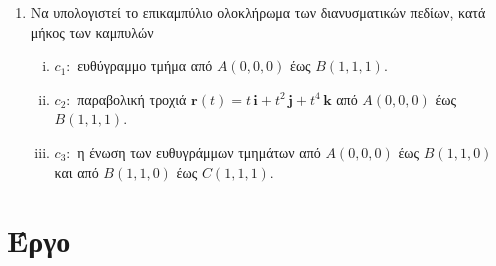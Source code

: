 \begin{enumerate}
  \item Να υπολογιστεί το επικαμπύλιο ολοκλήρωμα των διανυσματικών πεδίων, κατά μήκος των
    καμπυλών 
    \begin{enumerate}[i)]
      \item $ c_{1} \colon $ ευθύγραμμο τμήμα από $ A(0,0,0) $ έως $ B(1,1,1) $.
      \item $ c_{2} \colon $ παραβολική τροχιά $ \mathbf{r}(t)=t\, \mathbf{i} +
        t^{2}\, \mathbf{j} + t^{4} \, \mathbf{k} $ από $ A(0,0,0) $ έως $ B(1,1,1) $.
      \item $ c_{3} \colon $ η ένωση των ευθυγράμμων τμημάτων από 
        $ A(0,0,0) $ έως $ B(1,1,0) $ και από $ B(1,1,0) $ έως $ C(1,1,1) $.
    \end{enumerate}

\end{enumerate}

\section*{Έργο}

